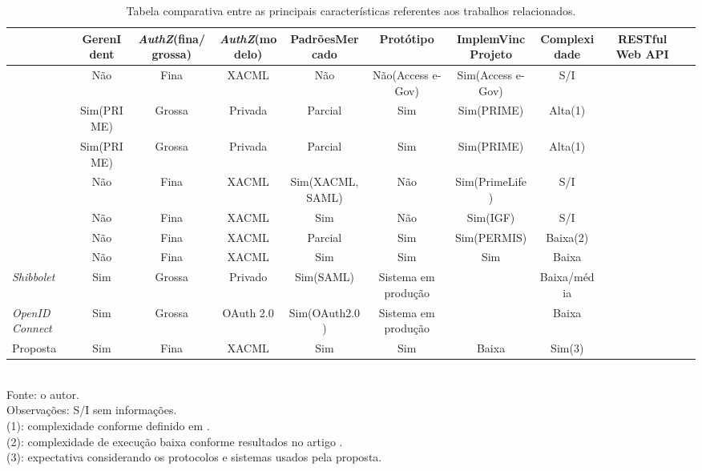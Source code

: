 \begin{table}
	\tiny
	\centering
	\caption{Tabela comparativa entre as principais características referentes aos trabalhos relacionados.}
	\label{tab-tabela-comparativa}
	\begin{tabular}{|m{6em}|c|c|c|c|c|c|c|c|c|}
		\hline  & GerenIdent & \textit{AuthZ}(fina/grossa) & \textit{AuthZ}(modelo) & PadrõesMercado & Protótipo & ImplemVincProjeto & Complexidade & RESTful Web API\\ 
		\hline \cite{kolter2007privacy}     & Não        & Fina   & XACML           & Não            & Não(Access e-Gov) & Sim(Access e-Gov) & S/I \\ 
		\hline \cite{ardagna2008privacy}    & Sim(PRIME) & Grossa & Privada         & Parcial        & Sim               & Sim(PRIME)        & Alta(1) \\ 
		\hline \cite{ardagna2010exploiting} & Sim(PRIME) & Grossa & Privada         & Parcial        & Sim               & Sim(PRIME)        & Alta(1) \\ 
		\hline \cite{ardagna2010enabling}   & Não        & Fina   & XACML           & Sim(XACML,SAML)  & Não               & Sim(PrimeLife)    & S/I \\ 
		\hline \cite{kounga2010extending}   & Não        & Fina   & XACML           & Sim            & Não               & Sim(IGF)          & S/I \\ 
		\hline \cite{chadwick2012privacy}   & Não        & Fina   & XACML           & Parcial        & Sim               & Sim(PERMIS)       & Baixa(2) \\ 
		\hline \cite{ma2015cloud}           & Não        & Fina   & XACML           & Sim            & Sim               & Sim               & Baixa \\ 
		\hline \textit{Shibbolet}           & Sim        & Grossa & Privado         & Sim(SAML)      & Sistema em produção & \-     & Baixa/média \\
		\hline \textit{OpenID Connect}      & Sim        & Grossa & OAuth 2.0       & Sim(OAuth2.0)  & Sistema em produção & \-     & Baixa \\    
		\hline Proposta                     & Sim        & Fina   & XACML           & Sim            & Sim               & Baixa             & Sim(3) \\
		\hline 
	\end{tabular} 
	\\ Fonte: o autor.
	\\ Observações: S/I sem informações.
	\\ (1): complexidade conforme definido em \cite{nogueira2014aprimoramento}.
	\\ (2): complexidade de execução baixa conforme resultados no artigo \cite{chadwick2012privacy}.
	\\ (3): expectativa considerando os protocolos e sistemas usados pela proposta.
\end{table}

